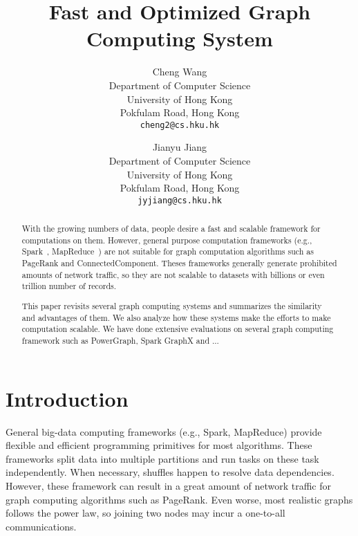 \documentclass{acm_proc_article}
\newcommand{\eg}[0]{e.g.,}
\begin{document}
%

\title{Fast and Optimized Graph Computing System}
%

\author{
Cheng Wang\\
Department of Computer Science\\
University of Hong Kong\\
Pokfulam Road, Hong Kong\\
\texttt{cheng2@cs.hku.hk}
\and Jianyu Jiang\\
Department of Computer Science\\
University of Hong Kong \\
Pokfulam Road, Hong Kong \\
\texttt{jyjiang@cs.hku.hk}
}


\maketitle
\begin{abstract}
With the growing numbers of data, people desire a fast and scalable framework
for computations on them. However, general purpose computation
frameworks (\eg{} Spark~\cite{nsdi12:spark}, MapReduce~\cite{mapreduce})
are not suitable for graph computation algorithms such as PageRank and
ConnectedComponent. Theses frameworks generally generate prohibited amounts
of network traffic, so they are not scalable to datasets with billions or
even trillion number of records.

This paper revisits several graph computing systems and summarizes the similarity
and advantages of them. We also analyze how these systems make the efforts to
make computation scalable. We have done extensive evaluations on several graph
computing framework such as PowerGraph, Spark GraphX and ...
\end{abstract}


\section{Introduction}
General big-data computing frameworks (\eg{} Spark, MapReduce) provide
flexible and efficient programming primitives for most algorithms.
These frameworks split data into multiple partitions and run tasks on
these task independently. When necessary, shuffles happen to resolve data
dependencies.
However, these framework can result in a great amount of network traffic
for graph computing algorithms such as PageRank. Even worse, most realistic graphs
follows the power law, so joining two nodes may incur a one-to-all communications.
\end{document}
